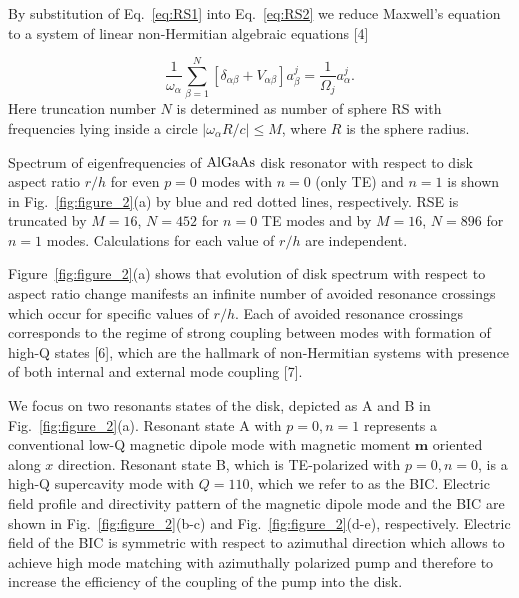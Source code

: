 \documentclass[prl,notitlepage,twocolumn]{revtex4}
\begin{document}
By substitution of Eq.~\ref{eq:RS1} into Eq.~\ref{eq:RS2} we reduce Maxwell's equation to a system of linear non-Hermitian algebraic equations [4]

\begin{equation}
\frac{1}{\omega_\alpha}\sum\limits_{\beta=1}^N\left[\delta_{\alpha\beta}+V_{\alpha\beta}\right]a_{\beta}^j=\frac{1}{\Omega_j}a_{\alpha}^j.
\end{equation}
Here truncation number $N$ is determined as number of sphere RS with frequencies lying inside a circle $|\omega_{\alpha}R/c|\le M$, where $R$ is the sphere radius.

Spectrum of eigenfrequencies of ${\rm AlGaAs}$ disk resonator with respect to disk aspect ratio $r/h$ for even $p=0$ modes with $n = 0$ (only TE) and $n = 1$ is shown in Fig.~\ref{fig:figure_2}(a) by blue and red dotted lines, respectively. RSE is truncated by $M=16$, $N=452$ for $n=0$ TE modes and by $M=16$, $N=896$ for $n=1$ modes. Calculations for each value of $r/h$ are independent. 

Figure~\ref{fig:figure_2}(a) shows that evolution of disk spectrum with respect to aspect ratio change manifests an infinite number of avoided resonance crossings which occur for specific values of $r/h$. Each of avoided resonance crossings corresponds to the regime of strong coupling between modes with formation of high-Q states [6], which are the hallmark of non-Hermitian systems with presence of both internal and external mode coupling [7]. 

We focus on two resonants states of the disk, depicted as A and B in Fig.~\ref{fig:figure_2}(a). Resonant state A with $p=0, n=1$ represents a conventional low-Q magnetic dipole mode with magnetic moment $\mathbf{m}$ oriented along $x$ direction. Resonant state B, which is  TE-polarized  with $p=0, n=0$, is a high-Q supercavity mode with $Q=110$, which we refer to as the BIC. Electric field profile and directivity pattern of the magnetic dipole mode and the BIC are shown in Fig.~\ref{fig:figure_2}(b-c) and Fig.~\ref{fig:figure_2}(d-e), respectively. Electric field of the BIC is symmetric with respect to azimuthal direction which allows to achieve high mode matching with azimuthally polarized pump and therefore to increase the efficiency of the coupling of the pump into the disk.
\end{document}
